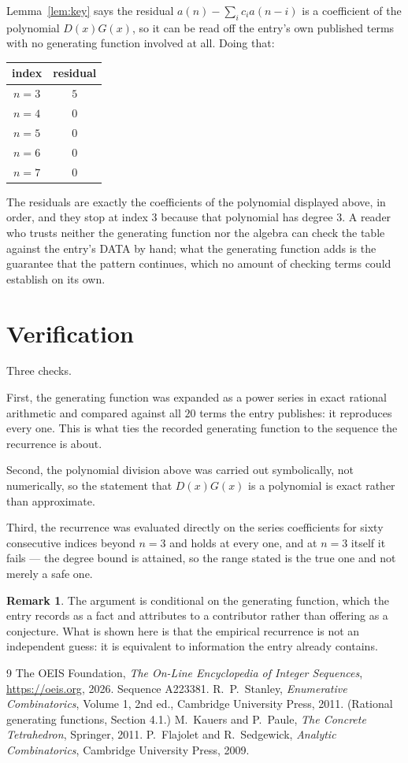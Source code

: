 \documentclass[11pt,a4paper]{article}
\theoremstyle{plain}
\theoremstyle{definition}
\newtheorem{remark}[theorem]{Remark}
\begin{document}
Lemma~\ref{lem:key} says the residual $a(n)-\sum_ic_ia(n-i)$ is a coefficient of the
polynomial $D(x)G(x)$, so it can be read off the entry's own published terms with no
generating function involved at all. Doing that:
\begin{center}
\begin{tabular}{cc}
index & residual \\ \hline
$n=3$ & $5$ \\
$n=4$ & $0$ \\
$n=5$ & $0$ \\
$n=6$ & $0$ \\
$n=7$ & $0$
\end{tabular}
\end{center}
The residuals are exactly the coefficients of the polynomial displayed above, in order, and
they stop at index $3$ because that polynomial has degree $3$. A reader who trusts
neither the generating function nor the algebra can check the table against the entry's DATA
by hand; what the generating function adds is the guarantee that the pattern continues, which
no amount of checking terms could establish on its own.

\section{Verification}

Three checks.

First, the generating function was expanded as a power series in exact rational arithmetic and
compared against all $20$ terms the entry publishes: it reproduces every one. This is
what ties the recorded generating function to the sequence the recurrence is about.

Second, the polynomial division above was carried out symbolically, not numerically, so the
statement that $D(x)G(x)$ is a polynomial is exact rather than approximate.

Third, the recurrence was evaluated directly on the series coefficients for sixty consecutive
indices beyond $n=3$ and holds at every one, and at $n=3$ itself it fails --- the
degree bound is attained, so the range stated is the true one and not merely a safe one.

\begin{remark}
The argument is conditional on the generating function, which the entry records as a fact and
attributes to a contributor rather than offering as a conjecture. What is shown here is that
the empirical recurrence is not an independent guess: it is equivalent to information the
entry already contains.
\end{remark}

\begin{thebibliography}{9}
 The OEIS Foundation, \emph{The On-Line Encyclopedia of Integer
Sequences}, \url{https://oeis.org}, 2026. Sequence A223381.
 R.~P.~Stanley, \emph{Enumerative Combinatorics}, Volume 1, 2nd ed.,
Cambridge University Press, 2011. (Rational generating functions, Section 4.1.)
 M.~Kauers and P.~Paule, \emph{The Concrete Tetrahedron}, Springer, 2011.
 P.~Flajolet and R.~Sedgewick, \emph{Analytic Combinatorics}, Cambridge
University Press, 2009.
\end{thebibliography}
\end{document}
